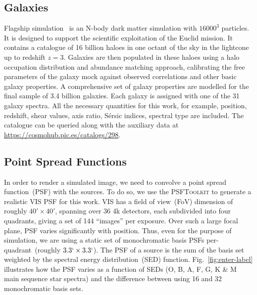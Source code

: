 \documentclass[11pt]{EuclidVIS}
\numberwithin{table}{section}
\numberwithin{figure}{section}
\begin{document}
\subsection{Galaxies}
Flagship simulation~\citep{2024arXiv240513495E} is an N-body dark matter simulation with $16000^3$
particles. It is designed to support the scientific exploitation of the Euclid mission. It contains
a catalogue of 16 billion haloes in one octant of the sky in the lightcone up to redshift $z=3$.
Galaxies are then populated in these haloes using a halo occupation distribution and abundance 
matching approach, calibrating the free parameters of the galaxy mock against observed correlations
and other basic galaxy properties. A comprehensive set of galaxy properties are modelled for the 
final sample of 3.4 billion galaxies. Each galaxy is assigned with one of the 31 galaxy spectra. All
the necessary quantities for this work, for example, position, redshift, shear values, axis ratio,
S\'{e}rsic indices, spectral type are included. The catalogue can be queried along with the
auxiliary data at \url{https://cosmohub.pic.es/catalogs/298}.

\subsection{Point Spread Functions}
In order to render a simulated image, we need to convolve a point spread function~(PSF) with the 
sources. To do so, we use the \textsc{PSFToolkit} to generate a realistic VIS PSF for this work. VIS
has a field of view~(FoV) dimension of roughly $40' \times 40'$, spanning over 36 4k
detectors, each subdivided into four quadrants, giving a set of 144 ``images'' per exposure. 
Over such a large focal plane, PSF varies significantly with position. Thus, even for the purpose
of simulation, we are using a static set of monochromatic basis PSFs per-quadrant~(roughly $3.3`
\times 3.3`$). The PSF of a source is the sum of the basis set weighted by the spectral energy 
distribution~(SED) function. Fig.~\ref{fig:enter-label} illustrates how the PSF varies as a function
of SEDs (O, B, A, F, G, K \& M main sequence star spectra) and the difference between using 16 and
32 monochromatic basis sets.
\end{document}
